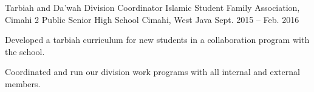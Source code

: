 


\begin{cventries}


\cventry
{Tarbiah and Da'wah Division Coordinator} %
{Islamic Student Family Association, Cimahi 2 Public Senior High School} %
{Cimahi, West Java} %
{Sept. 2015 -- Feb. 2016} %
{ %
\begin{cvitems}
\item {Developed a tarbiah curriculum for new students in a collaboration program with the school.}
\item {Coordinated and run our division work programs with all internal and external members.}
\end{cvitems}
}


\end{cventries}
